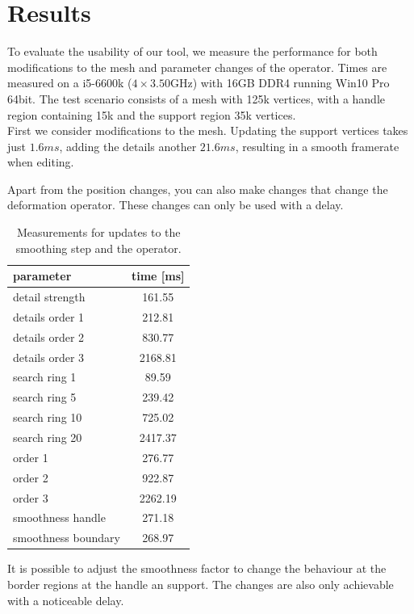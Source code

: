 \documentclass[twocolumn]{article}
\begin{document}
\section{Results}
To evaluate the usability of our tool, we measure the performance for both modifications to the mesh and parameter changes of the operator.
Times are measured on a i5-6600k ($4 \times 3.50$GHz) with 16GB DDR4 running Win10 Pro 64bit.
The test scenario consists of a mesh with 125k vertices, with a handle region containing 15k and the support region 35k vertices. \\
First we consider modifications to the mesh. Updating the support vertices takes just $1.6\si{ms}$, adding the details another $21.6\si{ms}$, resulting in a smooth framerate when editing.

Apart from the position changes, you can also make changes that change the deformation operator. These changes can only be used with a delay.

\begin{table}
	\centering
	\caption{Measurements for updates to the smoothing step and the operator.}
	\begin{tabular}{lc}
		parameter & time [ms] \\
		\hline
		detail strength & 161.55 \\
		details order 1 & 212.81 \\
		details order 2 & 830.77 \\
		details order 3 & 2168.81 \\
		search ring 1 & 89.59 \\
		search ring 5 & 239.42 \\
		search ring 10 & 725.02 \\
		search ring 20 & 2417.37 \\
		\hline
		order 1 & 276.77 \\
		order 2 & 922.87 \\
		order 3 & 2262.19 \\
		smoothness handle & 271.18 \\
		smoothness boundary & 268.97 \\	
		\hline
	\end{tabular}
\label{tab:order}
\end{table}

It is possible to adjust the smoothness factor to change the behaviour at the border regions at the handle an support.
The changes are also only achievable with a noticeable delay.



\end{document}
